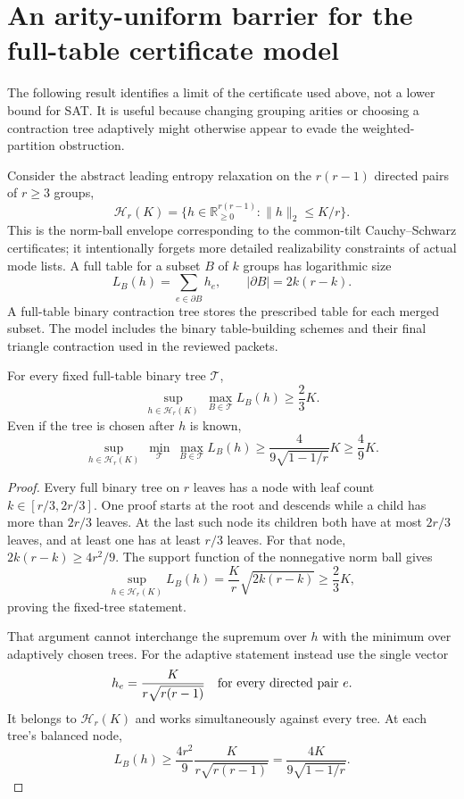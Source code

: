 \section{An arity-uniform barrier for the full-table certificate model}
\label{sec:cached-tree-barrier}

The following result identifies a limit of the certificate used above, not
a lower bound for SAT. It is useful because changing grouping arities or
choosing a contraction tree adaptively might otherwise appear to evade the
weighted-partition obstruction.

Consider the abstract leading entropy relaxation on the $r(r-1)$ directed
pairs of $r\ge3$ groups,
\[
 \mathcal H_r(K)=\{h\in\mathbb R_{\ge0}^{r(r-1)}:
                       \|h\|_2\le K/r\}.
\]
This is the norm-ball envelope corresponding to the common-tilt
Cauchy--Schwarz certificates; it intentionally forgets more detailed
realizability constraints of actual mode lists. A full table for a subset
$B$ of $k$ groups has logarithmic size
\[
 L_B(h)=\sum_{e\in\partial B}h_e,\qquad
 |\partial B|=2k(r-k).
\]
A full-table binary contraction tree stores the prescribed table for each
merged subset. The model includes the binary table-building schemes and
their final triangle contraction used in the reviewed packets.

\begin{proposition}
\label{prop:cached-tree-barrier}
For every fixed full-table binary tree $\mathcal T$,
\[
 \sup_{h\in\mathcal H_r(K)}\ \max_{B\in\mathcal T}L_B(h)
        \ge\frac23K.
\]
Even if the tree is chosen after $h$ is known,
\[
 \sup_{h\in\mathcal H_r(K)}\ \min_{\mathcal T}\
            \max_{B\in\mathcal T}L_B(h)
 \ge\frac{4}{9\sqrt{1-1/r}}K\ge\frac49K.
\]
\end{proposition}

\begin{proof}
Every full binary tree on $r$ leaves has a node with leaf count
$k\in[r/3,2r/3]$. One proof starts at the root and descends while a child
has more than $2r/3$ leaves. At the last such node its children both have
at most $2r/3$ leaves, and at least one has at least $r/3$ leaves.
For that node, $2k(r-k)\ge4r^2/9$. The support function of the nonnegative
norm ball gives
\[
 \sup_{h\in\mathcal H_r(K)}L_B(h)
       =\frac Kr\sqrt{2k(r-k)}\ge\frac23K,
\]
proving the fixed-tree statement.

That argument cannot interchange the supremum over $h$ with the minimum
over adaptively chosen trees. For the adaptive statement instead use the
single vector
\[
 h_e=\frac{K}{r\sqrt{r(r-1)}}\quad\hbox{for every directed pair }e.
\]
It belongs to $\mathcal H_r(K)$ and works simultaneously against every
tree. At each tree's balanced node,
\[
 L_B(h)\ge\frac{4r^2}{9}\frac{K}{r\sqrt{r(r-1)}}
       =\frac{4K}{9\sqrt{1-1/r}}.
\]
\end{proof}

